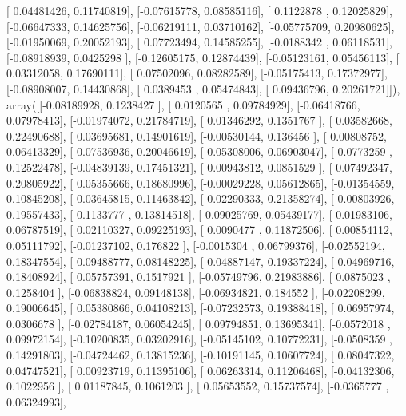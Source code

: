 \documentclass{article}
\begin{document}
       [ 0.04481426,  0.11740819],
       [-0.07615778,  0.08585116],
       [ 0.1122878 ,  0.12025829],
       [-0.06647333,  0.14625756],
       [-0.06219111,  0.03710162],
       [-0.05775709,  0.20980625],
       [-0.01950069,  0.20052193],
       [ 0.07723494,  0.14585255],
       [-0.0188342 ,  0.06118531],
       [-0.08918939,  0.0425298 ],
       [-0.12605175,  0.12874439],
       [-0.05123161,  0.05456113],
       [ 0.03312058,  0.17690111],
       [ 0.07502096,  0.08282589],
       [-0.05175413,  0.17372977],
       [-0.08908007,  0.14430868],
       [ 0.0389453 ,  0.05474843],
       [ 0.09436796,  0.20261721]]), array([[-0.08189928,  0.1238427 ],
       [ 0.0120565 ,  0.09784929],
       [-0.06418766,  0.07978413],
       [-0.01974072,  0.21784719],
       [ 0.01346292,  0.1351767 ],
       [ 0.03582668,  0.22490688],
       [ 0.03695681,  0.14901619],
       [-0.00530144,  0.136456  ],
       [ 0.00808752,  0.06413329],
       [ 0.07536936,  0.20046619],
       [ 0.05308006,  0.06903047],
       [-0.0773259 ,  0.12522478],
       [-0.04839139,  0.17451321],
       [ 0.00943812,  0.0851529 ],
       [ 0.07492347,  0.20805922],
       [ 0.05355666,  0.18680996],
       [-0.00029228,  0.05612865],
       [-0.01354559,  0.10845208],
       [-0.03645815,  0.11463842],
       [ 0.02290333,  0.21358274],
       [-0.00803926,  0.19557433],
       [-0.1133777 ,  0.13814518],
       [-0.09025769,  0.05439177],
       [-0.01983106,  0.06787519],
       [ 0.02110327,  0.09225193],
       [ 0.0090477 ,  0.11872506],
       [ 0.00854112,  0.05111792],
       [-0.01237102,  0.176822  ],
       [-0.0015304 ,  0.06799376],
       [-0.02552194,  0.18347554],
       [-0.09488777,  0.08148225],
       [-0.04887147,  0.19337224],
       [-0.04969716,  0.18408924],
       [ 0.05757391,  0.1517921 ],
       [-0.05749796,  0.21983886],
       [ 0.0875023 ,  0.1258404 ],
       [-0.06838824,  0.09148138],
       [-0.06934821,  0.184552  ],
       [-0.02208299,  0.19006645],
       [ 0.05380866,  0.04108213],
       [-0.07232573,  0.19388418],
       [ 0.06957974,  0.0306678 ],
       [-0.02784187,  0.06054245],
       [ 0.09794851,  0.13695341],
       [-0.0572018 ,  0.09972154],
       [-0.10200835,  0.03202916],
       [-0.05145102,  0.10772231],
       [-0.0508359 ,  0.14291803],
       [-0.04724462,  0.13815236],
       [-0.10191145,  0.10607724],
       [ 0.08047322,  0.04747521],
       [ 0.00923719,  0.11395106],
       [ 0.06263314,  0.11206468],
       [-0.04132306,  0.1022956 ],
       [ 0.01187845,  0.1061203 ],
       [ 0.05653552,  0.15737574],
       [-0.0365777 ,  0.06324993],
\end{document}
